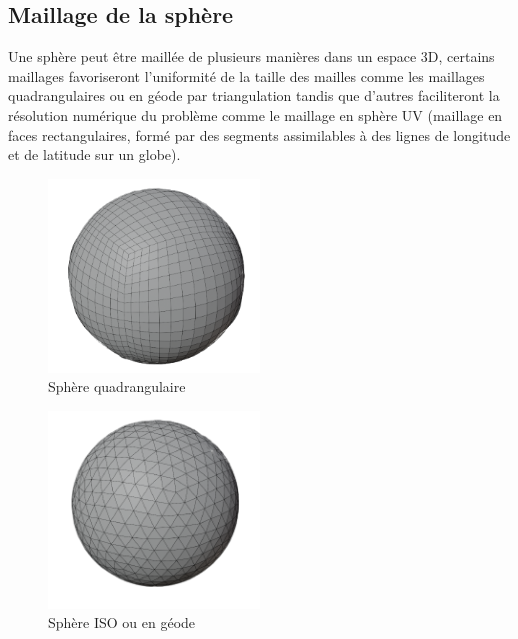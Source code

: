 \documentclass[fleqn]{article}
\begin{document}
\subsection{Maillage de la sphère}
Une sphère peut être maillée de plusieurs manières dans un espace 3D, certains maillages favoriseront l'uniformité de la taille des mailles comme les maillages quadrangulaires ou en géode par triangulation tandis que d'autres faciliteront la résolution numérique du problème comme le maillage en sphère UV (maillage en faces rectangulaires, formé par des segments assimilables à des lignes de longitude et de latitude sur un globe).
\begin{center}
    \begin{minipage}[b]{0.33333\textwidth}
        \begin{figure}[H]
            \centering
            \includegraphics[width = 0.5\textwidth]{images/sphere quad.png}
            \caption{Sphère quadrangulaire}
        \end{figure}
    \end{minipage}
    \begin{minipage}[b]{0.33333\textwidth}
    \centering
    \begin{figure}[H]
        \centering
        \includegraphics[width = 0.5\textwidth]{images/sphere iso.png}
        \caption[short]{Sphère ISO ou en géode}

\end{figure}
\end{minipage}
\end{center}
\end{document}
